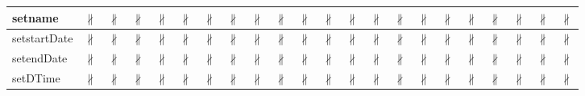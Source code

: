 \documentclass[10pt]{article}
\begin{document}
\begin{longtable}{|l|l|l|l|l|l|l|l|l|l|l|l|l|l|l|l|l|l|l|l|l|l|}
\hline
setname&{\color{BrickRed}$\nparallel$}&{\color{BrickRed}$\nparallel$}&{\color{BrickRed}$\nparallel$}&{\color{BrickRed}$\nparallel$}&{\color{BrickRed}$\nparallel$}&{\color{BrickRed}$\nparallel$}&{\color{BrickRed}$\nparallel$}&{\color{BrickRed}$\nparallel$}&{\color{BrickRed}$\nparallel$}&{\color{BrickRed}$\nparallel$}&{\color{BrickRed}$\nparallel$}&{\color{BrickRed}$\nparallel$}&{\color{BrickRed}$\nparallel$}&{\color{BrickRed}$\nparallel$}&{\color{BrickRed}$\nparallel$}&{\color{BrickRed}$\nparallel$}&{\color{BrickRed}$\nparallel$}&{\color{BrickRed}$\nparallel$}&{\color{BrickRed}$\nparallel$}&{\color{BrickRed}$\nparallel$}&{\color{BrickRed}$\nparallel$}\\
\hline
setstartDate&{\color{BrickRed}$\nparallel$}&{\color{BrickRed}$\nparallel$}&{\color{BrickRed}$\nparallel$}&{\color{BrickRed}$\nparallel$}&{\color{BrickRed}$\nparallel$}&{\color{BrickRed}$\nparallel$}&{\color{BrickRed}$\nparallel$}&{\color{BrickRed}$\nparallel$}&{\color{BrickRed}$\nparallel$}&{\color{BrickRed}$\nparallel$}&{\color{BrickRed}$\nparallel$}&{\color{BrickRed}$\nparallel$}&{\color{BrickRed}$\nparallel$}&{\color{BrickRed}$\nparallel$}&{\color{BrickRed}$\nparallel$}&{\color{BrickRed}$\nparallel$}&{\color{BrickRed}$\nparallel$}&{\color{BrickRed}$\nparallel$}&{\color{BrickRed}$\nparallel$}&{\color{BrickRed}$\nparallel$}&{\color{BrickRed}$\nparallel$}\\
\hline
setendDate&{\color{BrickRed}$\nparallel$}&{\color{BrickRed}$\nparallel$}&{\color{BrickRed}$\nparallel$}&{\color{BrickRed}$\nparallel$}&{\color{BrickRed}$\nparallel$}&{\color{BrickRed}$\nparallel$}&{\color{BrickRed}$\nparallel$}&{\color{BrickRed}$\nparallel$}&{\color{BrickRed}$\nparallel$}&{\color{BrickRed}$\nparallel$}&{\color{BrickRed}$\nparallel$}&{\color{BrickRed}$\nparallel$}&{\color{BrickRed}$\nparallel$}&{\color{BrickRed}$\nparallel$}&{\color{BrickRed}$\nparallel$}&{\color{BrickRed}$\nparallel$}&{\color{BrickRed}$\nparallel$}&{\color{BrickRed}$\nparallel$}&{\color{BrickRed}$\nparallel$}&{\color{BrickRed}$\nparallel$}&{\color{BrickRed}$\nparallel$}\\
\hline
setDTime&{\color{BrickRed}$\nparallel$}&{\color{BrickRed}$\nparallel$}&{\color{BrickRed}$\nparallel$}&{\color{BrickRed}$\nparallel$}&{\color{BrickRed}$\nparallel$}&{\color{BrickRed}$\nparallel$}&{\color{BrickRed}$\nparallel$}&{\color{BrickRed}$\nparallel$}&{\color{BrickRed}$\nparallel$}&{\color{BrickRed}$\nparallel$}&{\color{BrickRed}$\nparallel$}&{\color{BrickRed}$\nparallel$}&{\color{BrickRed}$\nparallel$}&{\color{BrickRed}$\nparallel$}&{\color{BrickRed}$\nparallel$}&{\color{BrickRed}$\nparallel$}&{\color{BrickRed}$\nparallel$}&{\color{BrickRed}$\nparallel$}&{\color{BrickRed}$\nparallel$}&{\color{BrickRed}$\nparallel$}&{\color{BrickRed}$\nparallel$}\\

\end{longtable}
\end{document}
